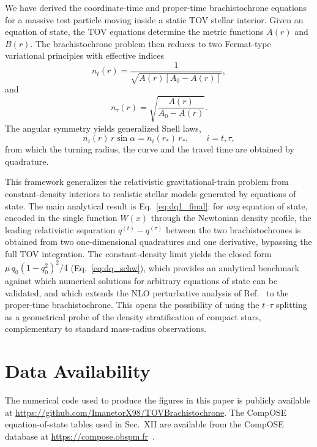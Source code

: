 \documentclass[
  aps,
  prd,
  twocolumn,
  nofootinbib,
  superscriptaddress,
  longbibliography
]{revtex4-2}
\begin{document}
We have derived the coordinate-time and proper-time brachistochrone
equations for a massive test particle moving inside a static TOV
stellar interior. Given an equation of state, the TOV equations
determine the metric functions $A(r)$ and $B(r)$. The brachistochrone
problem then reduces to two Fermat-type variational principles with
effective indices
\begin{equation}
n_t(r)
=
\frac{1}
{\sqrt{
A(r)\left[A_0-A(r)\right]
}},
\end{equation}
and
\begin{equation}
n_\tau(r)
=
\sqrt{
\frac{A(r)}{A_0-A(r)}
}.
\end{equation}
The angular symmetry yields generalized Snell laws,
\begin{equation}
n_i(r)\,r\sin\alpha
=
n_i(r_*)\,r_*,
\qquad
i=t,\tau,
\end{equation}
from which the turning radius, the curve and the travel time are
obtained by quadrature.

This framework generalizes the relativistic gravitational-train problem
from constant-density interiors to realistic stellar models generated
by equations of state. The main analytical result is
Eq.~\eqref{eq:dq1_final}: for \emph{any} equation of state, encoded
in the single function $W(x)$ through the Newtonian density profile,
the leading relativistic separation $q^{(t)}-q^{(\tau)}$ between the
two brachistochrones is obtained from two one-dimensional
quadratures and one derivative, bypassing the full TOV integration.
The constant-density limit yields the closed form $\mu\,q_0(1-q_0^2)^2/4$
(Eq.~\eqref{eq:dq_schw}), which provides an analytical benchmark
against which numerical solutions for arbitrary equations of state can
be validated, and which extends the NLO perturbative analysis of
Ref.~\cite{Rosignoli2026} to the proper-time brachistochrone.
This opens the possibility of using the $t$--$\tau$ splitting as a
geometrical probe of the density stratification of compact stars,
complementary to standard mass-radius observations.

\section*{Data Availability}
The numerical code used to produce the figures in this paper
is publicly available at
\url{https://github.com/ImanetorX98/TOVBrachistochrone}.
The CompOSE equation-of-state tables used in Sec.~XII are
available from the CompOSE database at
\url{https://compose.obspm.fr}~\cite{Compose}.
\end{document}
